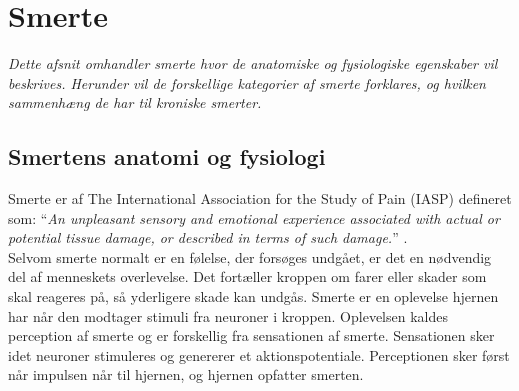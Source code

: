 \section{Smerte}
\textit{Dette afsnit omhandler smerte hvor de anatomiske og fysiologiske egenskaber vil beskrives. Herunder vil de forskellige kategorier af smerte forklares, og hvilken sammenhæng de har til kroniske smerter.}

\subsection{Smertens anatomi og fysiologi}
Smerte er af The International Association for the Study of Pain (IASP) defineret som: “\textit{An unpleasant sensory and emotional experience associated with actual or potential tissue damage, or described in terms of such damage.}” \citep{Carmon}.\\
Selvom smerte normalt er en følelse, der forsøges undgået, er det en nødvendig del af menneskets overlevelse. Det fortæller kroppen om farer eller skader som skal reageres på, så yderligere skade kan undgås.
Smerte er en oplevelse hjernen har når den modtager stimuli fra neuroner i kroppen. Oplevelsen kaldes perception af smerte og er forskellig fra sensationen af smerte. Sensationen sker idet neuroner stimuleres og genererer et aktionspotentiale. Perceptionen sker først når impulsen når til hjernen, og hjernen opfatter smerten. 





